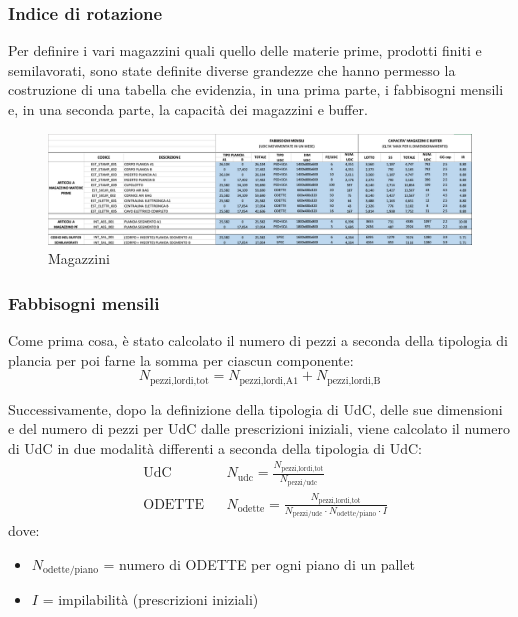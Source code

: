 \documentclass[11pt]{article}
\begin{document}
\subsubsection{Indice di rotazione}
Per definire i vari magazzini quali quello delle materie prime, prodotti finiti e semilavorati, sono state definite diverse grandezze che hanno permesso la costruzione di una tabella che evidenzia, in una prima parte, i fabbisogni mensili e, in una seconda parte, la capacità dei magazzini e buffer.
\begin{figure} [H]
    \centering
    \includegraphics[width=\textwidth]{images/Magazzini.png}
    \caption{Magazzini}
    \label{fig: Magazzini}
\end{figure}

\subsubsection{Fabbisogni mensili}
Come prima cosa, è stato calcolato il numero di pezzi a seconda della tipologia di plancia per poi farne la somma per ciascun componente:
\begin{equation}
    N_\text{pezzi,lordi,tot} = N_\text{pezzi,lordi,A1} + N_\text{pezzi,lordi,B}
\end{equation}

Successivamente, dopo la definizione della tipologia di UdC, delle sue dimensioni e del numero di pezzi per UdC dalle prescrizioni iniziali, viene calcolato il numero di UdC in due modalità differenti a seconda della tipologia di UdC:
\begin{align}
    & \text{UdC} 
    && N_\text{udc} = \frac{N_\text{pezzi,lordi,tot}}{N_\text{pezzi/udc}} 
    \\
    & \text{ODETTE} 
    && N_\text{odette} = \frac{N_\text{pezzi,lordi,tot}}{N_\text{pezzi/udc}\cdot N_\text{odette/piano}\cdot I }
\end{align}
dove:
\begin{itemize}
    \item $N_\text{odette/piano}$ = numero di ODETTE per ogni piano di un pallet
    \item $I$ = impilabilità (prescrizioni iniziali)
\end{itemize}
\end{document}
